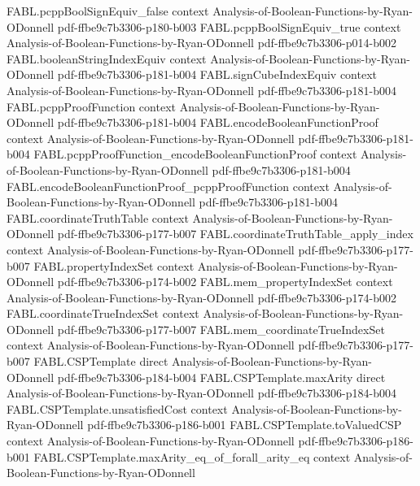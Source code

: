 \begin{theorem}
  {FABL.pcppBoolSignEquiv_false}
  {context}
  {Analysis-of-Boolean-Functions-by-Ryan-ODonnell}
  {pdf-ffbe9c7b3306-p180-b003}
\proofstep
  {FABL.pcppBoolSignEquiv_true}
  {context}
  {Analysis-of-Boolean-Functions-by-Ryan-ODonnell}
  {pdf-ffbe9c7b3306-p014-b002}
\proofstep
  {FABL.booleanStringIndexEquiv}
  {context}
  {Analysis-of-Boolean-Functions-by-Ryan-ODonnell}
  {pdf-ffbe9c7b3306-p181-b004}
\proofstep
  {FABL.signCubeIndexEquiv}
  {context}
  {Analysis-of-Boolean-Functions-by-Ryan-ODonnell}
  {pdf-ffbe9c7b3306-p181-b004}
\proofstep
  {FABL.pcppProofFunction}
  {context}
  {Analysis-of-Boolean-Functions-by-Ryan-ODonnell}
  {pdf-ffbe9c7b3306-p181-b004}
\proofstep
  {FABL.encodeBooleanFunctionProof}
  {context}
  {Analysis-of-Boolean-Functions-by-Ryan-ODonnell}
  {pdf-ffbe9c7b3306-p181-b004}
\proofstep
  {FABL.pcppProofFunction_encodeBooleanFunctionProof}
  {context}
  {Analysis-of-Boolean-Functions-by-Ryan-ODonnell}
  {pdf-ffbe9c7b3306-p181-b004}
\proofstep
  {FABL.encodeBooleanFunctionProof_pcppProofFunction}
  {context}
  {Analysis-of-Boolean-Functions-by-Ryan-ODonnell}
  {pdf-ffbe9c7b3306-p181-b004}
\proofstep
  {FABL.coordinateTruthTable}
  {context}
  {Analysis-of-Boolean-Functions-by-Ryan-ODonnell}
  {pdf-ffbe9c7b3306-p177-b007}
\proofstep
  {FABL.coordinateTruthTable_apply_index}
  {context}
  {Analysis-of-Boolean-Functions-by-Ryan-ODonnell}
  {pdf-ffbe9c7b3306-p177-b007}
\proofstep
  {FABL.propertyIndexSet}
  {context}
  {Analysis-of-Boolean-Functions-by-Ryan-ODonnell}
  {pdf-ffbe9c7b3306-p174-b002}
\proofstep
  {FABL.mem_propertyIndexSet}
  {context}
  {Analysis-of-Boolean-Functions-by-Ryan-ODonnell}
  {pdf-ffbe9c7b3306-p174-b002}
\proofstep
  {FABL.coordinateTrueIndexSet}
  {context}
  {Analysis-of-Boolean-Functions-by-Ryan-ODonnell}
  {pdf-ffbe9c7b3306-p177-b007}
\proofstep
  {FABL.mem_coordinateTrueIndexSet}
  {context}
  {Analysis-of-Boolean-Functions-by-Ryan-ODonnell}
  {pdf-ffbe9c7b3306-p177-b007}
\proofstep
  {FABL.CSPTemplate}
  {direct}
  {Analysis-of-Boolean-Functions-by-Ryan-ODonnell}
  {pdf-ffbe9c7b3306-p184-b004}
\proofstep
  {FABL.CSPTemplate.maxArity}
  {direct}
  {Analysis-of-Boolean-Functions-by-Ryan-ODonnell}
  {pdf-ffbe9c7b3306-p184-b004}
\proofstep
  {FABL.CSPTemplate.unsatisfiedCost}
  {context}
  {Analysis-of-Boolean-Functions-by-Ryan-ODonnell}
  {pdf-ffbe9c7b3306-p186-b001}
\proofstep
  {FABL.CSPTemplate.toValuedCSP}
  {context}
  {Analysis-of-Boolean-Functions-by-Ryan-ODonnell}
  {pdf-ffbe9c7b3306-p186-b001}
\proofstep
  {FABL.CSPTemplate.maxArity_eq_of_forall_arity_eq}
  {context}
  {Analysis-of-Boolean-Functions-by-Ryan-ODonnell}

\end{theorem}
